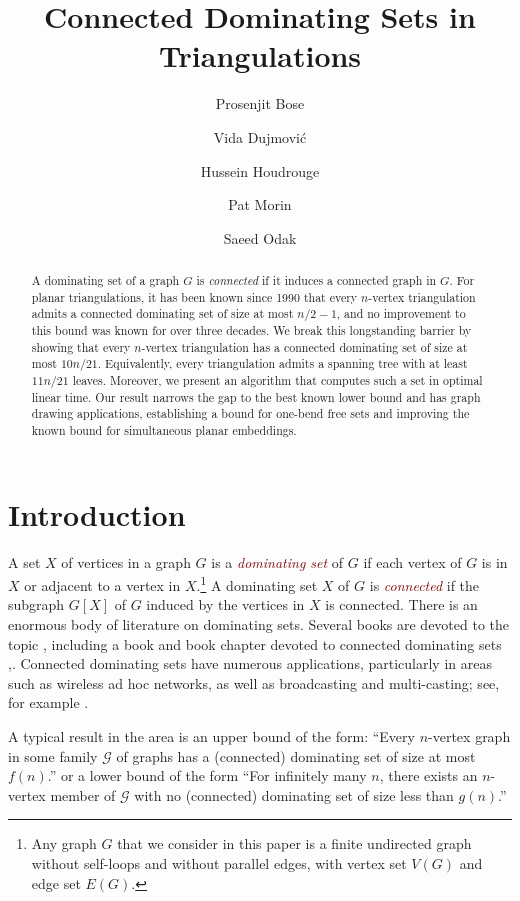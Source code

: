 \documentclass[a4paper,UKenglish, cleveref, autoref, thm-restate]{lipics-v2021}
\title{Connected Dominating Sets in Triangulations} %
\author{Prosenjit Bose}{School of Computer Science, Carleton University, Ottawa, Canada.}{jit@scs.carleton.ca}{https://orcid.org/0000-0002-8906-0573}{Research partially funded by NSERC.}%
\author{Vida Dujmović}{School of Computer Science and Electrical Engineering, University of Ottawa. Ottawa, Canada.}{vida.dujmovic@uottawa.ca}{https://orcid.org/0000-0001-7250-0600}{ Research partially funded by NSERC and a University of Ottawa Research Chair.}
\author{Hussein Houdrouge}{School of Computer Science, Carleton University, Ottawa, Canada.}{houdrouge.hussein@gmail.com}{https://orcid.org/0009-0007-4908-5294}{Research partially funded by NSERC.}
\author{Pat Morin}{School of Computer Science, Carleton University, Ottawa, Canada.}{morin@scs.carleton.ca}{https://orcid.org/0000-0003-0471-4118}{Research partially funded by NSERC.}
\author{Saeed Odak}{Department of Computer Science, Aalto University, Espoo, Finland.}{saeedodak@gmail.com}{https://orcid.org/0009-0005-6290-0965}{}
\newcommand{\defin}[1]{\emph{\textcolor{Maroon}{#1}}}
\begin{document}
\maketitle

\begin{abstract}
A dominating set of a graph $G$ is \emph{connected} if it induces a connected graph in $G$. For planar triangulations, it has been known since 1990 that every $n$-vertex triangulation admits a connected dominating set of size at most $n/2 - 1$, and no improvement to this bound was known for over three decades. We break this longstanding barrier by showing that every $n$-vertex triangulation has a connected dominating set of size at most $10n/21$. Equivalently, every triangulation admits a spanning tree with at least $11n/21$ leaves. Moreover, we present an algorithm that computes such a set in optimal linear time. Our result narrows the gap to the best known lower bound and has graph drawing applications, establishing a bound for one-bend free sets and improving the known bound for simultaneous planar embeddings.
\end{abstract}

\section{Introduction}
A set $X$ of vertices in a graph $G$ is a \defin{dominating set} of $G$ if each vertex of $G$ is in $X$ or adjacent to a vertex in $X$.\footnote{Any graph $G$ that we consider in this paper is a finite undirected graph without self-loops and without parallel edges, with vertex set $V(G)$ and edge set $E(G)$.}  A dominating set $X$ of $G$ is \defin{connected} if the subgraph $G[X]$ of $G$ induced by the vertices in $X$ is connected.  There is an enormous body of literature on dominating sets. Several books are devoted to the topic \cite{haynes.hedetniemi.ea:domination,haynes.hedetniemi.ea:topics,du.wan:connected,haynes.hedetniemi.ea:vol2}, including a book and book chapter devoted to connected dominating sets \cite{du.wan:connected},\cite[Chapter~4]{haynes.hedetniemi.ea:domination}. Connected dominating sets have numerous applications, particularly in areas such as wireless ad hoc networks, as well as broadcasting and multi-casting; see, for example \cite{StojmenovicCDS2002}.

A typical result in the area is an upper bound of the form: ``Every $n$-vertex graph in some family $\mathcal{G}$ of graphs has a (connected) dominating set of size at most $f(n)$.'' or a lower bound of the form ``For infinitely many $n$, there exists an $n$-vertex member of $\mathcal{G}$ with no (connected) dominating set of size less than $g(n)$.''
\end{document}
